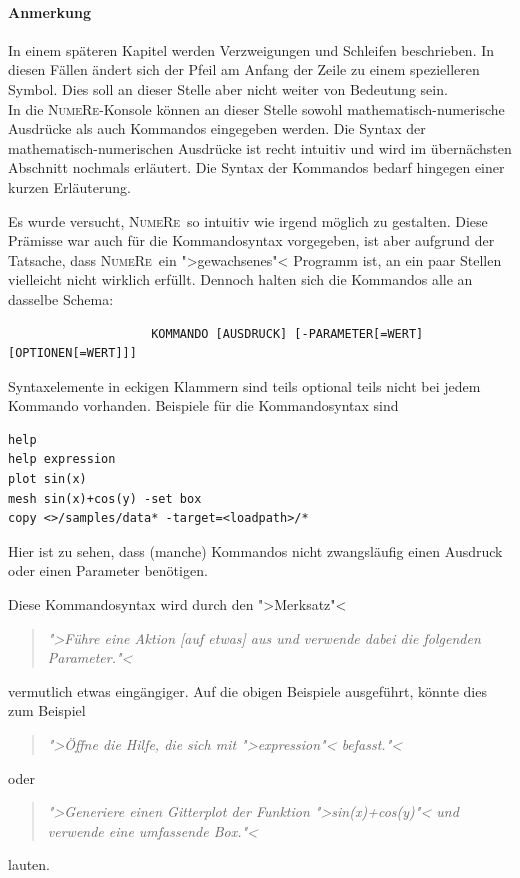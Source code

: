 \documentclass[DIV=14,headsepline,footsepline]{scrbook}
\newcommand{\NR}{\textsc{Nu\-me\-Re}}
\begin{document}
				\paragraph{Anmerkung}
					In einem späteren Kapitel werden Verzweigungen und Schleifen beschrieben. In diesen Fällen ändert sich der Pfeil am Anfang der Zeile zu einem spezielleren Symbol. Dies soll an dieser Stelle aber nicht weiter von Bedeutung sein.
				\bigskip\\
				In die \NR-Konsole können an dieser Stelle sowohl mathematisch-numerische Ausdrücke als auch Kommandos eingegeben werden. Die Syntax der mathematisch-numerischen Ausdrücke ist recht intuitiv und wird im übernächsten Abschnitt nochmals erläutert. Die Syntax der Kommandos bedarf hingegen einer kurzen Erläuterung.
				
				Es wurde versucht, \NR\ so intuitiv wie irgend möglich zu gestalten. Diese Prämisse war auch für die Kommandosyntax vorgegeben, ist aber aufgrund der Tatsache, dass \NR\ ein ">gewachsenes"< Programm ist, an ein paar Stellen vielleicht nicht wirklich erfüllt. Dennoch halten sich die Kommandos alle an dasselbe Schema:
				\begin{verbatim}
					KOMMANDO [AUSDRUCK] [-PARAMETER[=WERT] [OPTIONEN[=WERT]]]
				\end{verbatim}
				Syntaxelemente in eckigen Klammern sind teils optional teils nicht bei jedem Kommando vorhanden. Beispiele für die Kommandosyntax sind
				\begin{lstlisting}
help
help expression
plot sin(x)
mesh sin(x)+cos(y) -set box
copy <>/samples/data* -target=<loadpath>/*
				\end{lstlisting}
				Hier ist zu sehen, dass (manche) Kommandos nicht zwangsläufig einen Ausdruck oder einen Parameter benötigen.
				
				Diese Kommandosyntax wird durch den ">Merksatz"< 
				\begin{quotation}
					\noindent\emph{">Führe eine Aktion [auf etwas] aus und verwende dabei die folgenden Parameter."<}
				\end{quotation}
				vermutlich etwas eingängiger. Auf die obigen Beispiele ausgeführt, könnte dies zum Beispiel
				\begin{quotation}
					\noindent\emph{">Öffne die Hilfe, die sich mit ">expression"< befasst."<}
				\end{quotation}
				oder
				\begin{quotation}
					\noindent\emph{">Generiere einen Gitterplot der Funktion ">sin(x)+cos(y)"< und verwende eine umfassende Box."<}
				\end{quotation}
				lauten.
				
\end{document}
